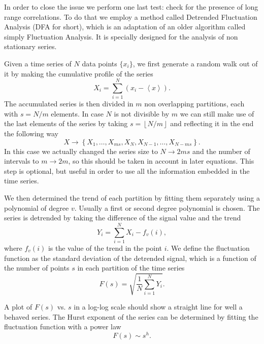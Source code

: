 In order to close the issue we perform one last test: check for the presence of
long range correlations. To do that we employ a method called Detrended
Fluctuation Analysis (DFA for short), which is an adaptation of an older
algorithm called simply Fluctuation Analysis. It is specially designed for the
analysis of non stationary series.%

Given a time series of $N$ data points $\{x_i\}$, we first generate a random walk
out of it by making the cumulative profile of the series
\begin{equation}
    X_i = \sum_{i=1}^{N} \left({x_i - \left\langle x \right\rangle}\right).
\end{equation}
The accumulated series is then divided in $m$ non overlapping partitions, each with
$s = N/m$ elements. In case $N$ is not divisible by $m$ we can still make use
of the last elements of the series by taking $s=\left\lfloor N/m\right\rfloor$
and reflecting it in the end the following way
\begin{equation}
    X\rightarrow\left\{X_1, \ldots, X_{ms},
                       X_{N}, X_{N - 1}, \ldots,
                       X_{N - ms}\right\}.
\end{equation}
In this case we actually changed the series size to $N\rightarrow2ms$ and the
number of intervals to $m\rightarrow2m$, so this should be taken in account in
later equations. This step is optional, but useful in order to use all the
information embedded in the time series.

We then determined the trend of each partition by fitting them separately using
a polynomial of degree $v$. Usually a first or second degree polynomial is
chosen. The series is detrended by taking the difference of the signal value and
the trend 
\begin{equation}
    Y_i = \sum_{i=1}^{N} X_i - f_v(i),
\end{equation}
where $f_v(i)$ is the value of the trend in the point $i$. We define the fluctuation
function as the standard deviation of the detrended signal, which is a function
of the number of points $s$ in each partition of the time series
\begin{equation}
    F(s) = \sqrt{\frac{1}{N}\sum_{i=1}^{N}Y_i}.
\end{equation}

A plot of $F(s)$ vs. $s$ in a log-log scale should show a straight line
for well a behaved series. %
The Hurst exponent of the series can be determined by fitting the fluctuation
function with a power law
\begin{equation}
    F(s)\sim s^h.
\end{equation}


